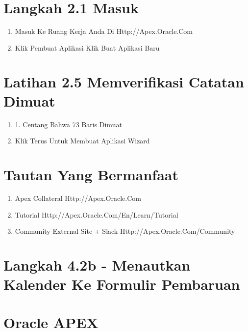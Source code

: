 \documentclass{article}
\begin{document}
\section{Langkah 2.1 Masuk}
\begin{enumerate}
    \item Masuk Ke Ruang Kerja Anda Di Http://Apex.Oracle.Com
    \item Klik Pembuat Aplikasi Klik Buat Aplikasi Baru

\end{enumerate}
\section{Latihan 2.5 Memverifikasi Catatan Dimuat}
\begin{enumerate}
    \item 1. Centang Bahwa 73 Baris Dimuat
    \item Klik Terus Untuk Membuat Aplikasi Wizard

\end{enumerate}
\section{Tautan Yang Bermanfaat}
\begin{enumerate}
    \item Apex  Collateral Http://Apex.Oracle.Com
\item Tutorial Http://Apex.Oracle.Com/En/Learn/Tutorial
\item Community External Site + Slack Http://Apex.Oracle.Com/Community

\end{enumerate}
\section{Langkah 4.2b - Menautkan Kalender Ke Formulir Pembaruan}
\usepackage{Note: Anda Mungkin Harus Menavigasi Ke Bulan Mei Untuk Melihat Entri Kalender}
\section{Oracle APEX}
\usepackage{Oracle Apex Adalah Aplikais Yang Digunakan Oleh Pelanggan Nyata Untuk Aplikasi Nyata Yang Digunakan Untuk Aplikasi Kritis Oportuninistik Dan Misi Yang Melayani Puluhan Ribu Pengguna Produk Mapan Pertama Kali Dirilis Pada Tahun 2004 Platform Pengembangan Aplikasi Kode Rendah Yang Paling Kuat: Memungkinkan Pengembangan Untuk Ficus Dalam Memecahkan Masalah Bisnis Dan Memberikan Solusi Yang Unggul, Dengan Lebih Sedikit Waktu Dan Upaya Yang Dihabiskan Untuk Pengodean Tingkat Rendah Biasa Dan Berulang Terus Berkembang. Oracle Install Base Mengadopsi Oracle Apex Untuk Meningkatkan Jumlah Proyek Dan Semakin Menjadi Standar IT Korporat Yang Disetujui
}
\end{document}
